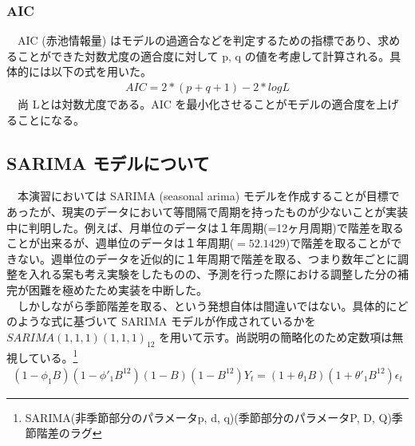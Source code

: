 \documentclass{scrartcl}
\begin{document}
\subsubsection{AIC}
\label{sec:orgb3eb3c6}
　AIC (赤池情報量) はモデルの過適合などを判定するための指標であり、求めることができた対数尤度の適合度に対して p, q の値を考慮して計算される。具体的には以下の式を用いた。\\
\begin{align}
AIC = 2 * (p + q + 1) - 2 * log L
\end{align}
　尚 Lとは対数尤度である。AIC を最小化させることがモデルの適合度を上げることになる。\\
\subsection{SARIMA モデルについて}
\label{sec:orgf282bf4}
　本演習においては SARIMA (seasonal arima) モデルを作成することが目標であったが、現実のデータにおいて等間隔で周期を持ったものが少ないことが実装中に判明した。例えば、月単位のデータは１年周期(=12ヶ月周期)で階差を取ることが出来るが、週単位のデータは１年周期(\(=52.1429\))で階差を取ることができない。週単位のデータを近似的に１年周期で階差を取る、つまり数年ごとに調整を入れる案も考え実験をしたものの、予測を行った際における調整した分の補完が困難を極めたため実装を中断した。\\
　しかしながら季節階差を取る、という発想自体は間違いではない。具体的にどのような式に基づいて SARIMA モデルが作成されているかを \(SARIMA(1,1,1)(1,1,1)_{12}\) を用いて示す。尚説明の簡略化のため定数項は無視している。\footnote{SARIMA(非季節部分のパラメータp, d, q)(季節部分のパラメータP, D, Q){季節階差のラグ}}
\begin{align}
(1-\phi_1 B)(1-\phi'_1B^{12})(1-B)(1-B^{12})Y_t = (1+\theta_1B)(1+\theta'_1B^{12})\epsilon_t
\end{align}
\end{document}
